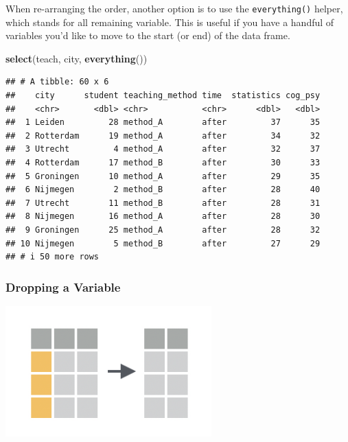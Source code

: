\documentclass[
]{scrartcl}
\newenvironment{Shaded}{\begin{snugshade}}{\end{snugshade}}
\newcommand{\FunctionTok}[1]{\textcolor[rgb]{0.13,0.29,0.53}{\textbf{#1}}}
\newcommand{\NormalTok}[1]{#1}
\begin{document}
When re-arranging the order, another option is to use the \texttt{everything()} helper, which stands for all remaining variable. This is useful if you have a handful of variables you'd like to move to the start (or end) of the data frame.

\begin{Shaded}
\begin{Highlighting}[]
\FunctionTok{select}\NormalTok{(teach,  city, }\FunctionTok{everything}\NormalTok{())}
\end{Highlighting}
\end{Shaded}

\begin{verbatim}
## # A tibble: 60 x 6
##    city      student teaching_method time  statistics cog_psy
##    <chr>       <dbl> <chr>           <chr>      <dbl>   <dbl>
##  1 Leiden         28 method_A        after         37      35
##  2 Rotterdam      19 method_A        after         34      32
##  3 Utrecht         4 method_A        after         32      37
##  4 Rotterdam      17 method_B        after         30      33
##  5 Groningen      10 method_A        after         29      35
##  6 Nijmegen        2 method_B        after         28      40
##  7 Utrecht        11 method_B        after         28      31
##  8 Nijmegen       16 method_A        after         28      30
##  9 Groningen      25 method_A        after         28      32
## 10 Nijmegen        5 method_B        after         27      29
## # i 50 more rows
\end{verbatim}

\hypertarget{dropping-a-variable}{%
\subsubsection{Dropping a Variable}\label{dropping-a-variable}}

\begin{center}\includegraphics[width=300px]{images/dplyr-select-drop} \end{center}
\end{document}
